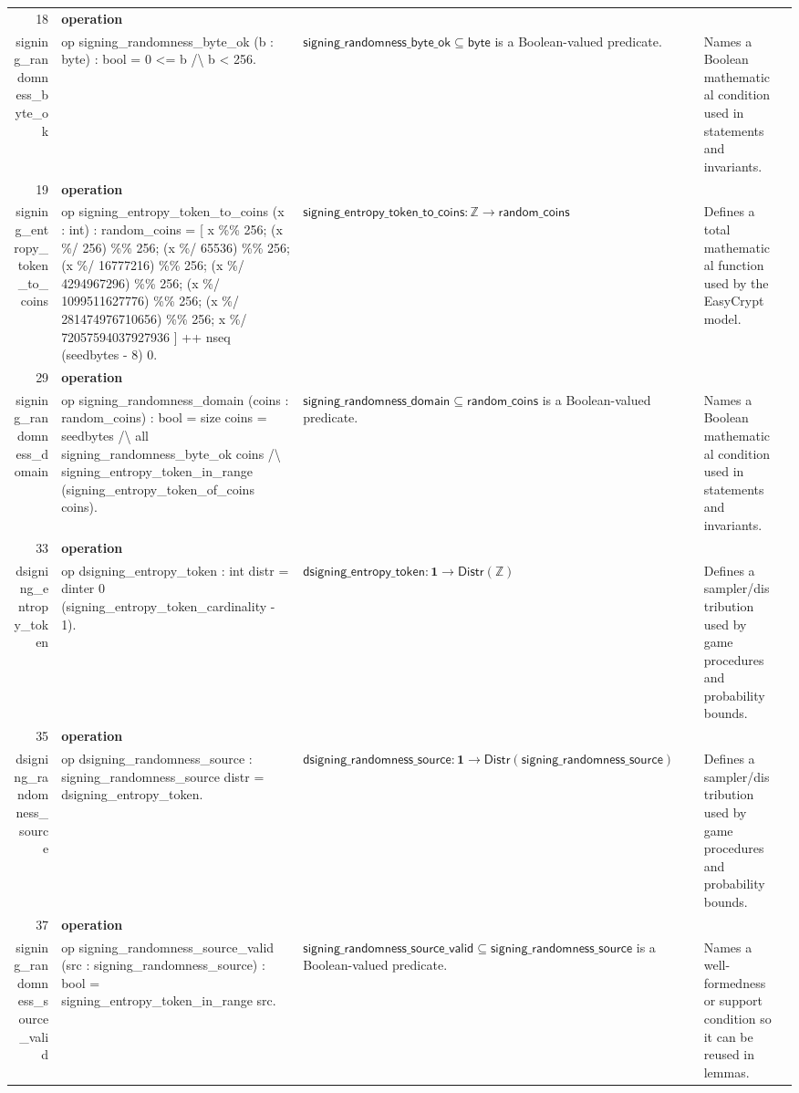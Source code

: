 \documentclass[10pt]{article}
\newcommand{\ec}[1]{\begingroup\ttfamily\scriptsize #1\endgroup}
\begin{document}
\begin{longtable}{r L{0.17\textwidth} L{0.26\textwidth} L{0.27\textwidth} L{0.20\textwidth}}
18 & \textbf{operation}\\\ec{signing\_randomness\_byte\_ok} & \ec{op signing\_randomness\_byte\_ok (b : byte) : bool = 0 <= b /\textbackslash{} b < 256.} & \(\mathsf{signing\_randomness\_byte\_ok} \subseteq \mathsf{byte}\) is a Boolean-valued predicate. & Names a Boolean mathematical condition used in statements and invariants. \\
19 & \textbf{operation}\\\ec{signing\_entropy\_token\_to\_coins} & \ec{op signing\_entropy\_token\_to\_coins (x : int) : random\_coins = [ x \%\% 256; (x \%/ 256) \%\% 256; (x \%/ 65536) \%\% 256; (x \%/ 16777216) \%\% 256; (x \%/ 4294967296) \%\% 256; (x \%/ 1099511627776) \%\% 256; (x \%/ 281474976710656) \%\% 256; x \%/ 72057594037927936 ] ++ nseq (seedbytes - 8) 0.} & \(\mathsf{signing\_entropy\_token\_to\_coins} : \mathbb{Z} \to \mathsf{random\_coins}\) & Defines a total mathematical function used by the EasyCrypt model. \\
29 & \textbf{operation}\\\ec{signing\_randomness\_domain} & \ec{op signing\_randomness\_domain (coins : random\_coins) : bool = size coins = seedbytes /\textbackslash{} all signing\_randomness\_byte\_ok coins /\textbackslash{} signing\_entropy\_token\_in\_range (signing\_entropy\_token\_of\_coins coins).} & \(\mathsf{signing\_randomness\_domain} \subseteq \mathsf{random\_coins}\) is a Boolean-valued predicate. & Names a Boolean mathematical condition used in statements and invariants. \\
33 & \textbf{operation}\\\ec{dsigning\_entropy\_token} & \ec{op dsigning\_entropy\_token : int distr = dinter 0 (signing\_entropy\_token\_cardinality - 1).} & \(\mathsf{dsigning\_entropy\_token} : \mathbf{1} \to \mathsf{Distr}(\mathbb{Z})\) & Defines a sampler/distribution used by game procedures and probability bounds. \\
35 & \textbf{operation}\\\ec{dsigning\_randomness\_source} & \ec{op dsigning\_randomness\_source : signing\_randomness\_source distr = dsigning\_entropy\_token.} & \(\mathsf{dsigning\_randomness\_source} : \mathbf{1} \to \mathsf{Distr}(\mathsf{signing\_randomness\_source})\) & Defines a sampler/distribution used by game procedures and probability bounds. \\
37 & \textbf{operation}\\\ec{signing\_randomness\_source\_valid} & \ec{op signing\_randomness\_source\_valid (src : signing\_randomness\_source) : bool = signing\_entropy\_token\_in\_range src.} & \(\mathsf{signing\_randomness\_source\_valid} \subseteq \mathsf{signing\_randomness\_source}\) is a Boolean-valued predicate. & Names a well-formedness or support condition so it can be reused in lemmas. \\

\end{longtable}
\end{document}
